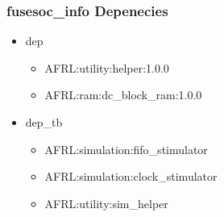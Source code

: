 \subsubsection{fusesoc\_info Depenecies}
\begin{itemize}
\item dep
	\begin{itemize}
	\item AFRL:utility:helper:1.0.0
	\item AFRL:ram:dc\_block\_ram:1.0.0
	\end{itemize}
\item dep\_tb
	\begin{itemize}
	\item AFRL:simulation:fifo\_stimulator
	\item AFRL:simulation:clock\_stimulator
	\item AFRL:utility:sim\_helper
	\end{itemize}
\end{itemize}

